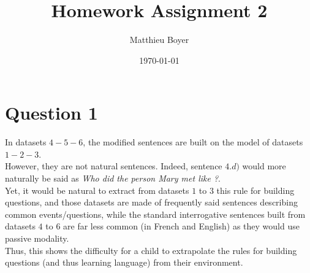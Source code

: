 \documentclass{cours}
\title{Homework Assignment 2}
\date{\today}
\author{Matthieu Boyer}
\begin{document}
    \section{Question 1}
        In datasets $4 - 5 - 6$, the modified sentences are built on the model of datasets $1 - 2 - 3$.\\
        However, they are not natural sentences. Indeed, sentence $4.d)$ would more naturally be said as \textsl{Who did the person Mary met like ?}.\\
        Yet, it would be natural to extract from datasets $1$ to $3$ this rule for building questions, and those datasets are made of frequently said sentences describing common events/questions, while the standard interrogative sentences built from datasets $4$ to $6$ are far less common (in French and English) as they would use passive modality.\\
        Thus, this shows the difficulty for a child to extrapolate the rules for building questions (and thus learning language) from their environment.
\end{document}

